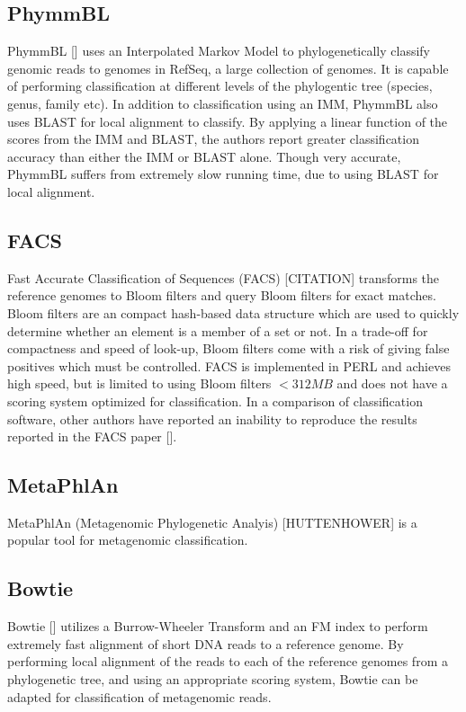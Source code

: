\documentclass[12pt]{article} %
\begin{document}
\subsection{PhymmBL}
PhymmBL [\cite{Brady:2009dg}] uses an Interpolated Markov Model to phylogenetically classify genomic reads to genomes in RefSeq, a large collection of genomes. It is capable of performing classification at different levels of the phylogentic tree (species, genus, family etc). In addition to classification using an IMM, PhymmBL also uses BLAST for local alignment to classify. By applying a linear function of the scores from the IMM and BLAST, the authors report greater classification accuracy than either the IMM or BLAST alone. Though very accurate, PhymmBL suffers from extremely slow running time, due to using BLAST for local alignment. 

\subsection{FACS}
Fast Accurate Classification of Sequences (FACS) [CITATION] transforms the reference genomes to Bloom filters and query Bloom filters for exact matches. Bloom filters are an compact hash-based data structure which are used to quickly determine whether an element is a member of a set or not. In a trade-off for compactness and speed of look-up, Bloom filters come with a risk of giving false positives which must be controlled. FACS is implemented in PERL and achieves high speed, but is limited to using Bloom filters $<312 MB$ and does not have a scoring system optimized for classification. In a comparison of classification software, other authors have reported an inability to reproduce the results reported in the FACS paper [\cite{Bazinet:2012dg}].

\subsection{MetaPhlAn}
MetaPhlAn (Metagenomic Phylogenetic Analyis) [HUTTENHOWER] is a popular tool for metagenomic classification. 

\subsection{Bowtie}
Bowtie [\cite{Langmead:2009dg}] utilizes a Burrow-Wheeler Transform and an FM index to perform extremely fast alignment of short DNA reads to a reference genome. By performing local alignment of the reads to each of the reference genomes from a phylogenetic tree, and using an appropriate scoring system, Bowtie can be adapted for classification of metagenomic reads. 
\end{document}
